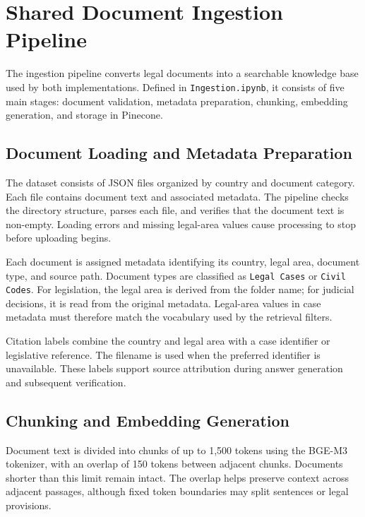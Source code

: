 \documentclass[a4paper,12pt]{report}
\begin{document}
\section{Shared Document Ingestion Pipeline}
\label{sec:shared-ingestion}

The ingestion pipeline converts legal documents into a searchable
knowledge base used by both implementations. Defined in
\texttt{Ingestion.ipynb}, it consists of five main stages: document
validation, metadata preparation, chunking, embedding generation,
and storage in Pinecone.

\subsection{Document Loading and Metadata Preparation}

The dataset consists of JSON files organized by country and document
category. Each file contains document text and associated metadata.
The pipeline checks the directory structure, parses each file, and
verifies that the document text is non-empty. Loading errors and
missing legal-area values cause processing to stop before uploading
begins.

Each document is assigned metadata identifying its country, legal
area, document type, and source path. Document types are classified
as \texttt{Legal Cases} or \texttt{Civil Codes}. For legislation,
the legal area is derived from the folder name; for judicial
decisions, it is read from the original metadata. Legal-area values
in case metadata must therefore match the vocabulary used by the
retrieval filters.

Citation labels combine the country and legal area with a case
identifier or legislative reference. The filename is used when the
preferred identifier is unavailable. These labels support source
attribution during answer generation and subsequent verification.

\subsection{Chunking and Embedding Generation}

Document text is divided into chunks of up to 1,500 tokens using
the BGE-M3 tokenizer, with an overlap of 150 tokens between adjacent
chunks. Documents shorter than this limit remain intact. The overlap
helps preserve context across adjacent passages, although fixed
token boundaries may split sentences or legal provisions.
\end{document}
